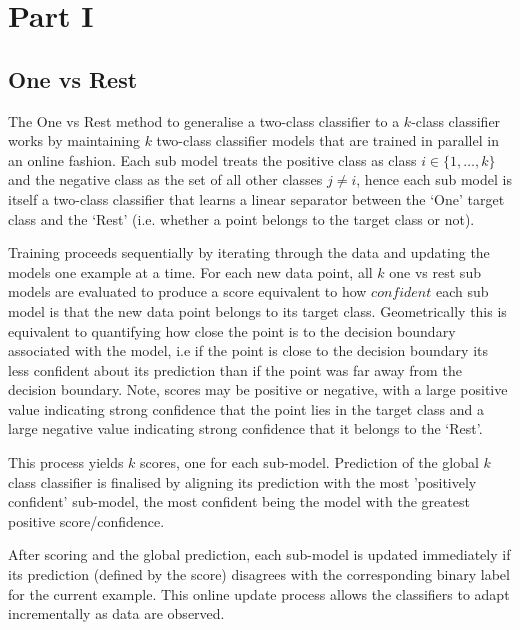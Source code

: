 \section{Part I}
\subsection{One vs Rest}
The One vs Rest method to generalise a two-class classifier to a 
$k$-class classifier works by maintaining 
$k$ two-class classifier models that are trained in parallel in an online fashion. Each sub model treats the positive class as class 
$i \in \{1,\dots,k\}$ and the negative class as the set of all other classes 
$j \neq i$, hence each sub model is itself a two-class classifier that learns a linear separator between the ‘One’ target class and the ‘Rest’ (i.e. whether a point belongs to the target class or not).

Training proceeds sequentially by iterating through the data and updating the models one example at a time. For each new data point, all 
$k$ one vs rest sub models are evaluated to produce a score equivalent to how $confident$ each sub model is that the new data point belongs to its target class. Geometrically this is equivalent to quantifying how close the point is to the decision boundary associated with the model, i.e if the point is close to the decision boundary its less confident about its prediction than if the point was far away from the decision boundary. Note, scores may be positive or negative, with a large positive value indicating strong confidence that the point lies in the target class and a large negative value indicating strong confidence that it belongs to the ‘Rest’.

This process yields $k$ scores, one for each sub-model. Prediction of the global $k$ class classifier is finalised by aligning its prediction with the most 'positively confident' sub-model, the most confident being the model with the greatest positive score/confidence.

After scoring and the global prediction, each sub-model is updated immediately if its prediction (defined by the score) disagrees with the corresponding binary label for the current example. This online update process allows the classifiers to adapt incrementally as data are observed.

